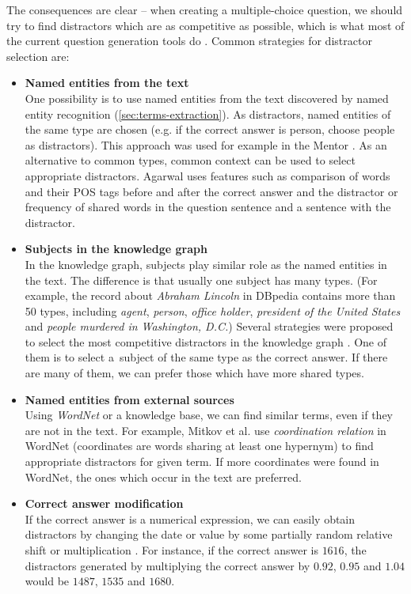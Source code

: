 \documentclass[12pt, twoside]{fithesis2}
\renewcommand{\_}{\leavevmode \kern0.07em\vbox{\hrule width0.4em}}
\newcommand{\squarebullet}{\textcolor{black}{\raisebox{0.15em}{\rule{4pt}{4pt}}}}
\newcommand{\emptysquarebullet}{\textcolor{black}{\raisebox{0.10em}{\tiny$\square$}}}
\newenvironment{myItemize}{
  \begin{itemize}[leftmargin=2em,rightmargin=1em,itemsep=\parskip ,parsep=0em,topsep=0em,partopsep=0em]
  \renewcommand{\labelitemi}{\squarebullet}
  \renewcommand{\labelitemii}{\textbullet}
}{
  \end{itemize}
}
\newcounter{choice}
\begin{document}
The consequences are clear -- when creating a multiple-choice question, we should try to find distractors which are as competitive as possible,
which is what most of the current question generation tools do
\cite{question-gen-mitkov, question-gen-textbooks, mentor}.
Common strategies for distractor selection are:
\begin{myItemize}
\item \textbf{Named entities from the text}\\
  One possibility is to use named entities from the text discovered by named entity recognition (\autoref{sec:terms-extraction}). As distractors, named entities of the same type are chosen (e.g. if the correct answer is person, choose people as distractors). This approach was used for example in the Mentor \cite{mentor}.
As an alternative to common types, common context can be used to select appropriate distractors.
Agarwal \cite{question-gen-textbooks} uses features such as comparison of words and their POS tags before and after the correct answer and the distractor or frequency of shared words in the question sentence and a sentence with the distractor.

\item \textbf{Subjects in the knowledge graph}\\
In the knowledge graph, subjects play similar role as the named entities in the text.
The difference is that usually one subject has many types.
(For example, the record about \emph{Abraham Lincoln} in DBpedia contains more than 50 types, including
\emph{agent}, \emph{person}, \emph{office holder}, \emph{president of the United States} and \emph{people murdered in Washington, D.C.})
Several strategies were proposed to select the most competitive distractors in the knowledge graph \cite{ontoque, question-gen-domain-ontologies}. One of them is to select a~subject of the same type as the correct answer. If there are many of them, we can prefer those which have more shared types.

\item \textbf{Named entities from external sources}\\
  Using \textit{WordNet} \cite{wordnet} or a knowledge base, we can find similar terms, even if they are not in the text. For example, Mitkov et al. \cite{question-gen-mitkov} use \textit{coordination relation} in WordNet (coordinates are words sharing at least one hypernym) to find appropriate distractors for given term. If more coordinates were found in WordNet, the ones which occur in the text are preferred.

\item \textbf{Correct answer modification}\\
  If the correct answer is a numerical expression, we can easily obtain distractors by changing the date or value by some partially random relative shift or multiplication
\cite{question-gen-domain-ontologies}.
For instance, if the correct answer is $1616$, the distractors generated by multiplying the correct answer by $0.92$, $0.95$ and $1.04$ would be $1487$, $1535$ and $1680$.
\end{myItemize}
\end{document}
